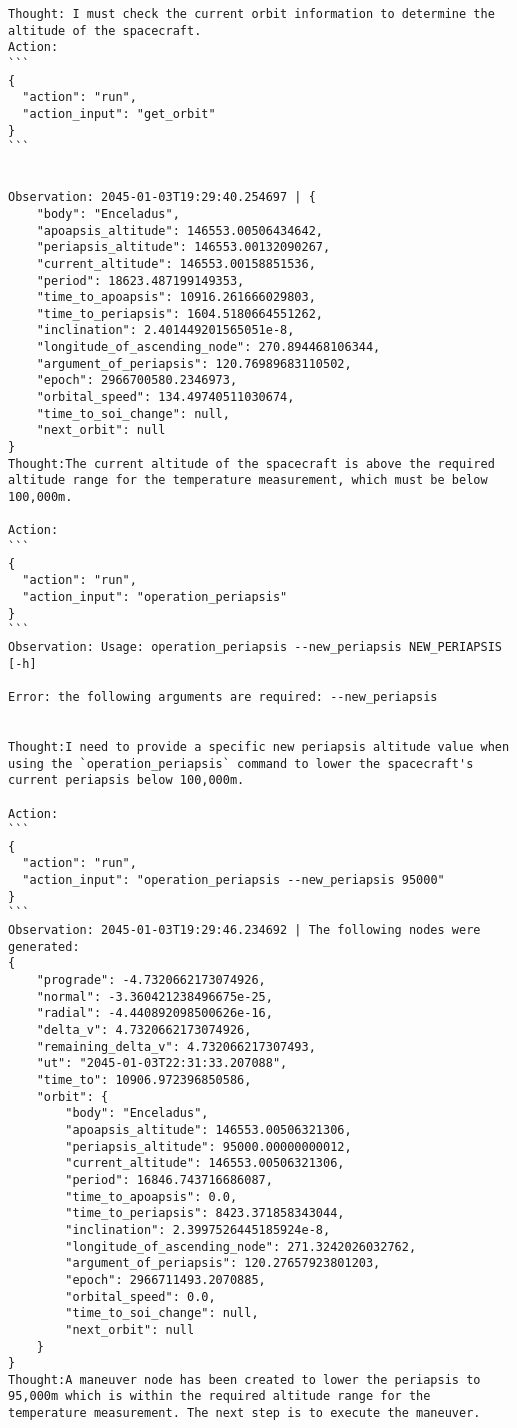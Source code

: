 \begin{lstlisting}
Thought: I must check the current orbit information to determine the altitude of the spacecraft.
Action:
```
{
  "action": "run",
  "action_input": "get_orbit"
}
```


Observation: 2045-01-03T19:29:40.254697 | {
    "body": "Enceladus",
    "apoapsis_altitude": 146553.00506434642,
    "periapsis_altitude": 146553.00132090267,
    "current_altitude": 146553.00158851536,
    "period": 18623.487199149353,
    "time_to_apoapsis": 10916.261666029803,
    "time_to_periapsis": 1604.5180664551262,
    "inclination": 2.401449201565051e-8,
    "longitude_of_ascending_node": 270.894468106344,
    "argument_of_periapsis": 120.76989683110502,
    "epoch": 2966700580.2346973,
    "orbital_speed": 134.49740511030674,
    "time_to_soi_change": null,
    "next_orbit": null
}
Thought:The current altitude of the spacecraft is above the required altitude range for the temperature measurement, which must be below 100,000m.

Action:
```
{
  "action": "run",
  "action_input": "operation_periapsis"
}
```
Observation: Usage: operation_periapsis --new_periapsis NEW_PERIAPSIS [-h]

Error: the following arguments are required: --new_periapsis


Thought:I need to provide a specific new periapsis altitude value when using the `operation_periapsis` command to lower the spacecraft's current periapsis below 100,000m.

Action:
```
{
  "action": "run",
  "action_input": "operation_periapsis --new_periapsis 95000"
}
```
Observation: 2045-01-03T19:29:46.234692 | The following nodes were generated:
{
    "prograde": -4.7320662173074926,
    "normal": -3.360421238496675e-25,
    "radial": -4.440892098500626e-16,
    "delta_v": 4.7320662173074926,
    "remaining_delta_v": 4.732066217307493,
    "ut": "2045-01-03T22:31:33.207088",
    "time_to": 10906.972396850586,
    "orbit": {
        "body": "Enceladus",
        "apoapsis_altitude": 146553.00506321306,
        "periapsis_altitude": 95000.00000000012,
        "current_altitude": 146553.00506321306,
        "period": 16846.743716686087,
        "time_to_apoapsis": 0.0,
        "time_to_periapsis": 8423.371858343044,
        "inclination": 2.3997526445185924e-8,
        "longitude_of_ascending_node": 271.3242026032762,
        "argument_of_periapsis": 120.27657923801203,
        "epoch": 2966711493.2070885,
        "orbital_speed": 0.0,
        "time_to_soi_change": null,
        "next_orbit": null
    }
}
Thought:A maneuver node has been created to lower the periapsis to 95,000m which is within the required altitude range for the temperature measurement. The next step is to execute the maneuver.


\end{lstlisting}
